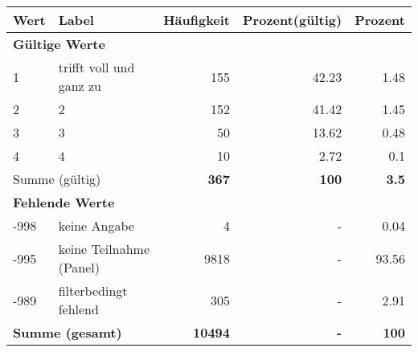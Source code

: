      \begin{longtable}{lXrrr}
     \toprule
     \textbf{Wert} & \textbf{Label} & \textbf{Häufigkeit} & \textbf{Prozent(gültig)} & \textbf{Prozent} \\
     \endhead
     \midrule
     \multicolumn{5}{l}{\textbf{Gültige Werte}}\\

     1 &
     \multicolumn{1}{X}{ trifft voll und ganz zu   } &


       \num{155} &
       \num[round-mode=places,round-precision=2]{42.23} &
         \num[round-mode=places,round-precision=2]{1.48} \\

     2 &
     \multicolumn{1}{X}{ 2   } &


       \num{152} &
       \num[round-mode=places,round-precision=2]{41.42} &
         \num[round-mode=places,round-precision=2]{1.45} \\

     3 &
     \multicolumn{1}{X}{ 3   } &


       \num{50} &
       \num[round-mode=places,round-precision=2]{13.62} &
         \num[round-mode=places,round-precision=2]{0.48} \\

     4 &
     \multicolumn{1}{X}{ 4   } &


       \num{10} &
       \num[round-mode=places,round-precision=2]{2.72} &
         \num[round-mode=places,round-precision=2]{0.1} \\
     \midrule
     \multicolumn{2}{l}{Summe (gültig)} &
       \textbf{\num{367}} &
     \textbf{\num{100}} &
       \textbf{\num[round-mode=places,round-precision=2]{3.5}} \\
     \multicolumn{5}{l}{\textbf{Fehlende Werte}}\\
       -998 &
       keine Angabe &
         \num{4} &
        - &
         \num[round-mode=places,round-precision=2]{0.04} \\
       -995 &
       keine Teilnahme (Panel) &
         \num{9818} &
        - &
         \num[round-mode=places,round-precision=2]{93.56} \\
       -989 &
       filterbedingt fehlend &
         \num{305} &
        - &
         \num[round-mode=places,round-precision=2]{2.91} \\
     \midrule
     \multicolumn{2}{l}{\textbf{Summe (gesamt)}} &
          \textbf{\num{10494}} &
        \textbf{-} &
        \textbf{\num{100}} \\
     \bottomrule
     \end{longtable}
     
